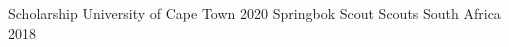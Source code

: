 

\begin{cvhonors}


\cvhonor
{Scholarship} %
{University of Cape Town} %
{} %
{2020} %
  \cvhonor
    {Springbok Scout} %
    {Scouts South Africa} %
    {} %
    {2018} %

\end{cvhonors}


